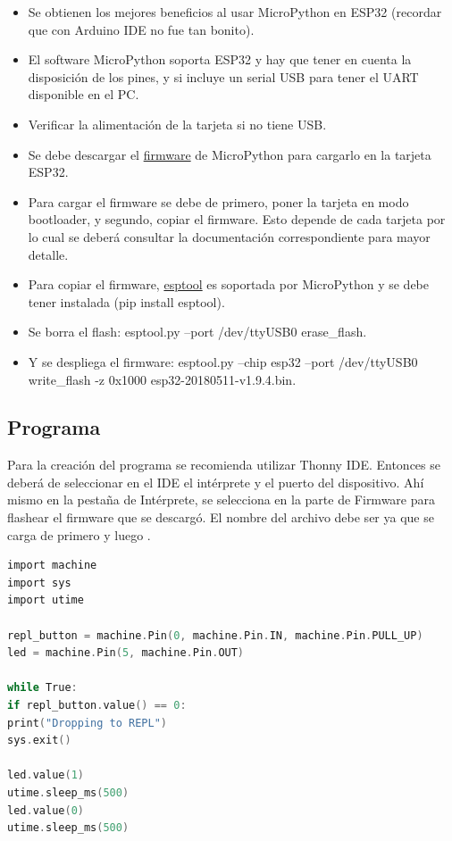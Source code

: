 \documentclass[conference]{IEEEtran}
\begin{document}
\begin{itemize}
\item Se obtienen los mejores beneficios al usar MicroPython en ESP32
(recordar que con Arduino IDE no fue tan bonito).

\item El software MicroPython soporta ESP32 y hay que tener en cuenta la
disposición de los pines, y si incluye un serial USB para tener el UART
disponible en el PC.

\item Verificar la alimentación de la tarjeta si no tiene USB.

\item Se debe descargar el \href{https://micropython.org/download/#esp32}{firmware}
de MicroPython para cargarlo en la tarjeta ESP32.

\item Para cargar el firmware se debe de primero, poner la tarjeta en modo
bootloader, y segundo, copiar el firmware. Esto depende de cada tarjeta por
lo cual se deberá consultar la documentación correspondiente para mayor detalle.

\item Para copiar el firmware, \href{https://github.com/espressif/esptool}{esptool}
es soportada por MicroPython y se debe tener instalada (pip install esptool).

\item Se borra el flash: esptool.py --port /dev/ttyUSB0 erase\_flash.

\item Y se despliega el firmware: esptool.py --chip esp32 --port /dev/ttyUSB0
write\_flash -z 0x1000 esp32-20180511-v1.9.4.bin.
\end{itemize}

\subsection{Programa}

Para la creación del programa se recomienda utilizar Thonny IDE. Entonces se
deberá de seleccionar en el IDE el intérprete y el puerto del dispositivo.
Ahí mismo en la pestaña de Intérprete, se selecciona en la parte de Firmware
para flashear el firmware que se descargó. El nombre del archivo debe ser
 ya que se carga  de primero y luego .

\bigbreak

\begin{lstlisting}[language=C, caption={Programa que hace parpadear un LED
hasta que se presiona el botón de salir en MicroPython. Fuente: Sparkfun
Electronics \cite{hymel}.}]
import machine
import sys
import utime

repl_button = machine.Pin(0, machine.Pin.IN, machine.Pin.PULL_UP)
led = machine.Pin(5, machine.Pin.OUT)

while True:
if repl_button.value() == 0:
print("Dropping to REPL")
sys.exit()

led.value(1)
utime.sleep_ms(500)
led.value(0)
utime.sleep_ms(500)
\end{lstlisting}
\end{document}

